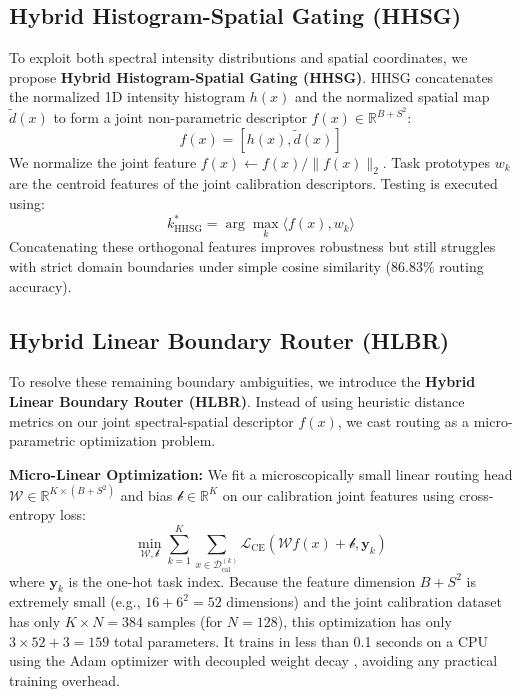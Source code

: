 \documentclass{article}
\theoremstyle{plain}
\theoremstyle{definition}
\theoremstyle{remark}
\begin{document}
\subsection{Hybrid Histogram-Spatial Gating (HHSG)}
To exploit both spectral intensity distributions and spatial coordinates, we propose \textbf{Hybrid Histogram-Spatial Gating (HHSG)}. HHSG concatenates the normalized 1D intensity histogram $h(x)$ and the normalized spatial map $\tilde{d}(x)$ to form a joint non-parametric descriptor $f(x) \in \mathbb{R}^{B + S^2}$:
\begin{equation}
    f(x) = \left[ h(x), \tilde{d}(x) \right]
\end{equation}
We normalize the joint feature $f(x) \leftarrow f(x) / \|f(x)\|_2$. Task prototypes $w_k$ are the centroid features of the joint calibration descriptors. Testing is executed using:
\begin{equation}
    k^*_{\text{HHSG}} = \arg\max_k \langle f(x), w_k \rangle
\end{equation}
Concatenating these orthogonal features improves robustness but still struggles with strict domain boundaries under simple cosine similarity ($86.83\%$ routing accuracy).

\subsection{Hybrid Linear Boundary Router (HLBR)}
To resolve these remaining boundary ambiguities, we introduce the \textbf{Hybrid Linear Boundary Router (HLBR)}. Instead of using heuristic distance metrics on our joint spectral-spatial descriptor $f(x)$, we cast routing as a micro-parametric optimization problem.

\textbf{Micro-Linear Optimization:} We fit a microscopically small linear routing head $\mathcal{W} \in \mathbb{R}^{K \times (B + S^2)}$ and bias $\mathcal{b} \in \mathbb{R}^K$ on our calibration joint features using cross-entropy loss:
\begin{equation}
    \min_{\mathcal{W}, \mathcal{b}} \sum_{k=1}^K \sum_{x \in \mathcal{D}_{\text{cal}}^{(k)}} \mathcal{L}_{\text{CE}} \left( \mathcal{W} f(x) + \mathcal{b}, \mathbf{y}_k \right)
\end{equation}
where $\mathbf{y}_k$ is the one-hot task index. Because the feature dimension $B + S^2$ is extremely small (e.g., $16 + 6^2 = 52$ dimensions) and the joint calibration dataset has only $K \times N = 384$ samples (for $N=128$), this optimization has only $3 \times 52 + 3 = 159$ total parameters. It trains in less than 0.1 seconds on a CPU using the Adam optimizer \citep{Kingma_2014} with decoupled weight decay \citep{Loshchilov_2017}, avoiding any practical training overhead.
\end{document}
